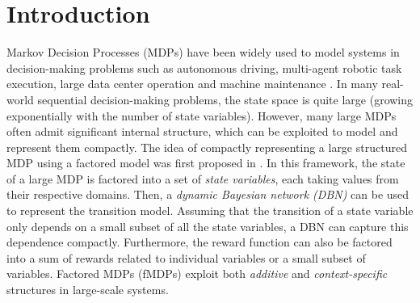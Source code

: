 \documentclass[twocolumn]{autart}    %
\begin{document}
\section{Introduction}
\label{sec:introduction}
Markov Decision Processes (MDPs) have been widely used to model systems in decision-making problems such as autonomous driving, multi-agent robotic task execution, large data center operation and machine maintenance \cite{ghasemi2019online}. In many real-world sequential decision-making problems, the state space is quite large (growing exponentially with the number of state variables). However, many large MDPs often admit significant internal structure, which can be exploited to model and represent them compactly. The idea of compactly representing a large structured MDP using a factored model was first proposed in \cite{boutilier1995exploiting}. In this framework, the state of a large MDP is factored into a set of \textit{state variables}, each taking values from their respective domains. Then, a \textit{dynamic Bayesian network (DBN)} can be used to represent the transition model. Assuming that the transition of a state variable only depends on a small subset of all the state variables, a DBN can capture this dependence compactly. Furthermore, the reward function can also be factored into a sum of rewards related to individual variables or a small subset of variables. Factored MDPs (fMDPs) exploit both \textit{additive} and \textit{context-specific} structures in large-scale systems. 
\end{document}

